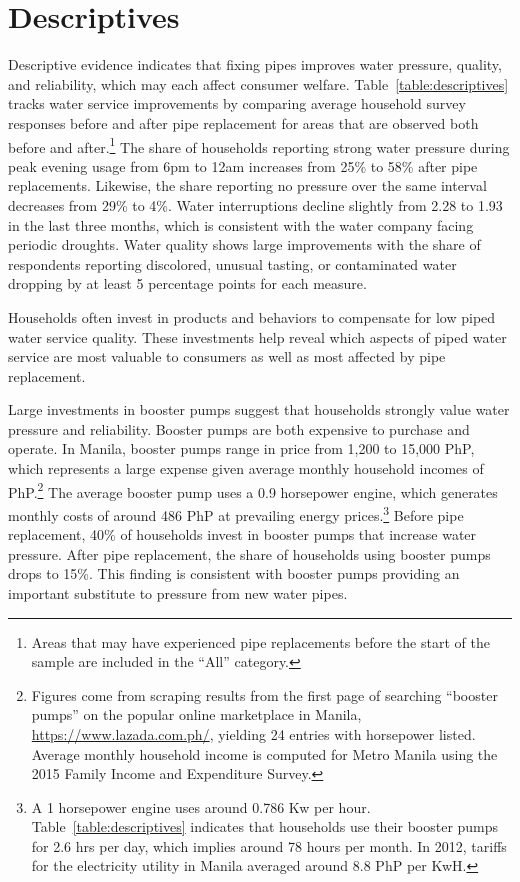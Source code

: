 \documentclass[12pt,table]{article}
\begin{document}



\section{Descriptives}\label{section:descriptives}

Descriptive evidence indicates that fixing pipes improves water pressure, quality, and reliability, which may each affect consumer welfare.  Table~\ref{table:descriptives} tracks water service improvements by comparing average household survey responses before and after pipe replacement for areas that are observed both before and after.\footnote{Areas that may have experienced pipe replacements before the start of the sample are included in the ``All'' category.}  The share of households reporting strong water pressure during peak evening usage from 6pm to 12am increases from 25\% to 58\% after pipe replacements.  Likewise, the share reporting no pressure over the same interval decreases from 29\% to 4\%.  Water interruptions decline slightly from 2.28 to 1.93 in the last three months, which is consistent with the water company facing periodic droughts.  Water quality shows large improvements with the share of respondents reporting discolored, unusual tasting, or contaminated water dropping by at least 5 percentage points for each measure.  

Households often invest in products and behaviors to compensate for low piped water service quality.  These investments help reveal which aspects of piped water service are most valuable to consumers as well as most affected by pipe replacement.  

Large investments in booster pumps suggest that households strongly value water pressure and reliability.  Booster pumps are both expensive to purchase and operate. In Manila, booster pumps range in price from 1,200 to 15,000 PhP, which represents a large expense given average monthly household incomes of PhP.\footnote{Figures come from scraping results from the first page of searching ``booster pumps'' on the popular online marketplace in Manila, \url{https://www.lazada.com.ph/},  yielding 24 entries with horsepower listed.  Average monthly household income is computed for Metro Manila using the 2015 Family Income and Expenditure Survey.}  The average booster pump uses a 0.9 horsepower engine, which generates monthly costs of around 486 PhP at prevailing energy prices.\footnote{A 1 horsepower engine uses around 0.786 Kw per hour.  Table~\ref{table:descriptives} indicates that households use their booster pumps for 2.6 hrs per day, which implies around 78 hours per month.  In 2012, tariffs for the electricity utility in Manila averaged around 8.8 PhP per KwH.}   Before pipe replacement, 40\% of households invest in booster pumps that increase water pressure.  After pipe replacement, the share of households using booster pumps drops to 15\%.  This finding is consistent with booster pumps providing an important substitute to pressure from new water pipes.
\end{document}
